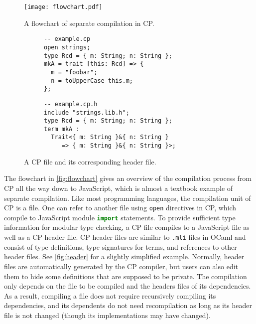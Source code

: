 \begin{figure}
\texttt{[image: flowchart.pdf]}
\caption{A flowchart of separate compilation in CP.} \label{fig:flowchart}
\end{figure}

\begin{figure}
\begin{subfigure}[t]{.5\textwidth}
\begin{lstlisting}
-- example.cp
open strings;
type Rcd = { m: String; n: String };
mkA = trait [this: Rcd] => {
  m = "foobar";
  n = toUpperCase this.m;
};
\end{lstlisting}
\end{subfigure}%
\begin{subfigure}[t]{.5\textwidth}
\begin{lstlisting}[morekeywords={include,term}]
-- example.cp.h
include "strings.lib.h";
type Rcd = { m: String; n: String };
term mkA :
  Trait<{ m: String }&{ n: String }
     => { m: String }&{ n: String }>;
\end{lstlisting}
\end{subfigure}
\caption{A CP file and its corresponding header file.} \label{fig:header}
\end{figure}

The flowchart in \autoref{fig:flowchart} gives an overview of the compilation
process from CP all the way down to JavaScript, which is almost a textbook
example of separate compilation. Like most programming languages, the
compilation unit of CP is a file. One can refer to another file using
\lstinline{open} directives in CP, which compile to JavaScript module
\lstinline[language=TypeScript]{import} statements. To provide sufficient type
information for modular type checking, a CP file compiles to a JavaScript file
as well as a CP header file. CP header files are similar to \lstinline{.mli}
files in OCaml and consist of type definitions, type signatures for terms, and
references to other header files. See \autoref{fig:header} for a slightly
simplified example. Normally, header files are automatically generated by the CP
compiler, but users can also edit them to hide some definitions that are
supposed to be private. The compilation only depends on the file to be compiled
and the headers files of its dependencies. As a result, compiling a file does
not require recursively compiling its dependencies, and its dependents do not
need recompilation as long as its header file is not changed (though its
implementations may have changed).

